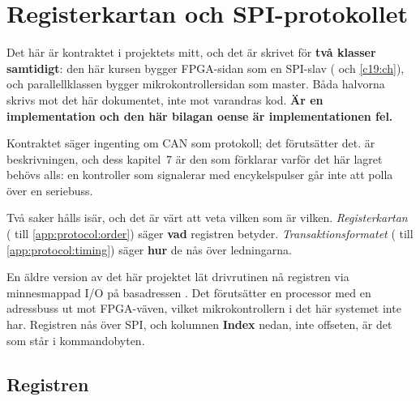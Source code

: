 
\chapter{Registerkartan och SPI-protokollet}
\label{app:protocol}

Det här är kontraktet i projektets mitt, och det är skrivet för \textbf{två klasser samtidigt}:
den här kursen bygger FPGA-sidan som en SPI-slav ( och \ref{c19:ch}), och
parallellklassen bygger mikrokontrollersidan som master. Båda halvorna skrivs mot det här dokumentet,
inte mot varandras kod. \textbf{Är en implementation och den här bilagan oense är implementationen
fel.}

Kontraktet säger ingenting om CAN som protokoll; det förutsätter det. \canbook{} är beskrivningen,
och dess kapitel~7 är den som förklarar varför det här lagret behövs alls: en kontroller som
signalerar med encykelspulser går inte att polla över en seriebuss.

Två saker hålls isär, och det är värt att veta vilken som är vilken. \emph{Registerkartan}
( till \ref{app:protocol:order}) säger \textbf{vad} registren betyder.
\emph{Transaktionsformatet} ( till \ref{app:protocol:timing}) säger
\textbf{hur} de nås över ledningarna.

\begin{warning}
En äldre version av det här projektet lät drivrutinen nå registren via minnesmappad I/O på
basadressen . Det förutsätter en processor med en adressbuss ut mot FPGA-väven,
vilket mikrokontrollern i det här systemet inte har. Registren nås över SPI, och kolumnen
\textbf{Index} nedan, inte offseten, är det som står i kommandobyten.
\end{warning}

\section{Registren}
\label{app:protocol:map}

